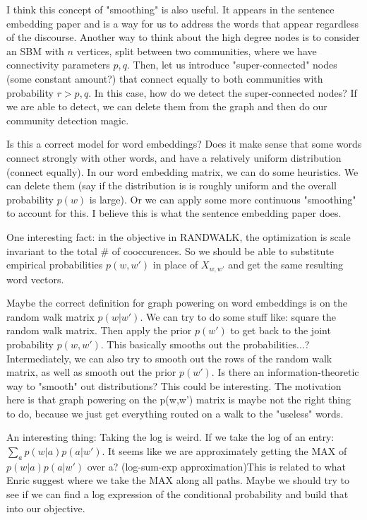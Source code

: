 \documentclass[12pt]{article}
\begin{document}
I think this concept of "smoothing" is also useful. It appears in the sentence embedding paper and is a way for us to address the words that appear regardless of the discourse. Another way to think about the high degree nodes is to consider an SBM with $n$ vertices, split between two communities, where we have connectivity parameters $p, q$. Then, let us introduce "super-connected" nodes (some constant amount?) that connect equally to both communities with probability $r>p,q$. In this case, how do we detect the super-connected nodes? If we are able to detect, we can delete them from the graph and then do our community detection magic.

Is this a correct model for word embeddings? Does it make sense that some words connect strongly with other words, and have a relatively uniform distribution (connect equally). In our word embedding matrix, we can do some heuristics. We can delete them (say if the distribution is is roughly uniform and the overall probability $p(w)$ is large). Or we can apply some more continuous "smoothing" to account for this. I believe this is what the sentence embedding paper does.

One interesting fact: in the objective in RANDWALK, the optimization is scale invariant to the total \# of cooccurences. So we should be able to substitute empirical probabilities $p(w,w')$ in place of $X_{w,w'}$ and get the same resulting word vectors.

Maybe the correct definition for graph powering on word embeddings is on the random walk matrix $p(w|w').$ We can try to do some stuff like: square the random walk matrix. Then apply the prior $p(w')$ to get back to the joint probability $p(w,w')$. This basically smooths out the probabilities...? Intermediately, we can also try to smooth out the rows of the random walk matrix, as well as smooth out the prior $p(w')$. Is there an information-theoretic way to "smooth" out distributions? This could be interesting. The motivation here is that graph powering on the p(w,w') matrix is maybe not the right thing to do, because we just get everything routed on a walk to the "useless" words. 

An interesting thing: Taking the log is weird. If we take the log of an entry: $\sum_a p(w|a) p(a|w')$. It seems like we are approximately getting the MAX of $p(w|a)p(a|w')$ over a? (log-sum-exp approximation)This is related to what Enric suggest where we take the MAX along all paths. Maybe we should try to see if we can find a log expression of the conditional probability and build that into our objective. 
\end{document}
